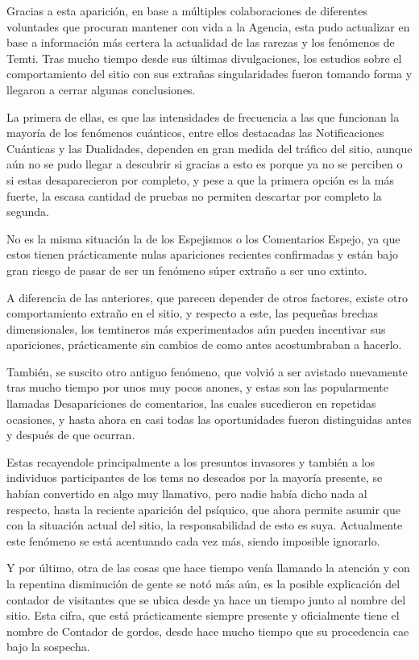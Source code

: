 \documentclass[
]{book}
\begin{document}
Gracias a esta aparición, en base a múltiples colaboraciones de diferentes voluntades que procuran mantener con vida a la Agencia, esta pudo actualizar en base a información más certera la actualidad de las rarezas y los fenómenos de Temti. Tras mucho tiempo desde sus últimas divulgaciones, los estudios sobre el comportamiento del sitio con sus extrañas singularidades fueron tomando forma y llegaron a cerrar algunas conclusiones.

La primera de ellas, es que las intensidades de frecuencia a las que funcionan la mayoría de los fenómenos cuánticos, entre ellos destacadas las Notificaciones Cuánticas y las Dualidades, dependen en gran medida del tráfico del sitio, aunque aún no se pudo llegar a descubrir si gracias a esto es porque ya no se perciben o si estas desaparecieron por completo, y pese a que la primera opción es la más fuerte, la escasa cantidad de pruebas no permiten descartar por completo la segunda.

No es la misma situación la de los Espejismos o los Comentarios Espejo, ya que estos tienen prácticamente nulas apariciones recientes confirmadas y están bajo gran riesgo de pasar de ser un fenómeno súper extraño a ser uno extinto.

A diferencia de las anteriores, que parecen depender de otros factores, existe otro comportamiento extraño en el sitio, y respecto a este, las pequeñas brechas dimensionales, los temtineros más experimentados aún pueden incentivar sus apariciones, prácticamente sin cambios de como antes acostumbraban a hacerlo.

También, se suscito otro antiguo fenómeno, que volvió a ser avistado nuevamente tras mucho tiempo por unos muy pocos anones, y estas son las popularmente llamadas Desapariciones de comentarios, las cuales sucedieron en repetidas ocasiones, y hasta ahora en casi todas las oportunidades fueron distinguidas antes y después de que ocurran.

Estas recayendole principalmente a los presuntos invasores y también a los individuos participantes de los tems no deseados por la mayoría presente, se habían convertido en algo muy llamativo, pero nadie había dicho nada al respecto, hasta la reciente aparición del psíquico, que ahora permite asumir que con la situación actual del sitio, la responsabilidad de esto es suya. Actualmente este fenómeno se está acentuando cada vez más, siendo imposible ignorarlo.

Y por último, otra de las cosas que hace tiempo venía llamando la atención y con la repentina disminución de gente se notó más aún, es la posible explicación del contador de visitantes que se ubica desde ya hace un tiempo junto al nombre del sitio. Esta cifra, que está prácticamente siempre presente y oficialmente tiene el nombre de Contador de gordos, desde hace mucho tiempo que su procedencia cae bajo la sospecha.
\end{document}
